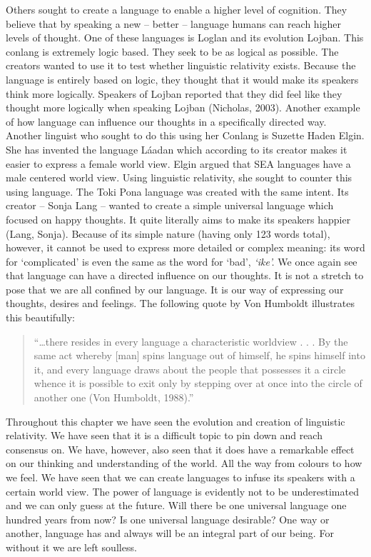  
	Others sought to create a language to enable a higher level of cognition. They believe that by speaking a new – better – language humans can reach higher levels of thought. One of these languages is Loglan and its evolution Lojban. This conlang is extremely logic based. They seek to be as logical as possible. The creators wanted to use it to test whether linguistic relativity exists. Because the language is entirely based on logic, they thought that it would make its speakers think more logically. Speakers of Lojban reported that they did feel like they thought more logically when speaking Lojban (Nicholas, 2003). Another example of how language can influence our thoughts in a specifically directed way. Another linguist who sought to do this using her Conlang is Suzette Haden Elgin. She has invented the language Láadan which according to its creator makes it easier to express a female world view. Elgin argued that SEA languages have a male centered world view. Using linguistic relativity, she sought to counter this using language. The Toki Pona language was created with the same intent. Its creator – Sonja Lang – wanted to create a simple universal language which focused on happy thoughts. It quite literally aims to make its speakers happier (Lang, Sonja). Because of its simple nature (having only 123 words total), however, it cannot be used to express more detailed or complex meaning: its word for ‘complicated’ is even the same as the word for ‘bad’, \textit{‘ike’.} We once again see that language can have a directed influence on our thoughts. It is not a stretch to pose that we are all confined by our language. It is our way of expressing our thoughts, desires and feelings. The following quote by Von Humboldt illustrates this beautifully: 

\begin{quote}
\begin{singlespace}
“…there resides in every language a characteristic worldview . . . By the same act whereby [man] spins language out of himself, he spins himself into it, and every language draws about the people that possesses it a circle whence it is possible to exit only by stepping over at once into the circle of another one (Von Humboldt, 1988).”
\end{singlespace}
\end{quote}

\noindent Throughout this chapter we have seen the evolution and creation of linguistic relativity. We have seen that it is a difficult topic to pin down and reach consensus on. We have, however, also seen that it does have a remarkable effect on our thinking and understanding of the world. All the way from colours to how we feel. We have seen that we can create languages to infuse its speakers with a certain world view. The power of language is evidently not to be underestimated and we can only guess at the future. Will there be one universal language one hundred years from now? Is one universal language desirable? One way or another, language has and always will be an integral part of our being. For without it we are left soulless.  

